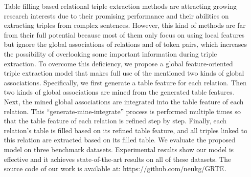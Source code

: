 Table filling based relational triple extraction methods are attracting growing research interests due to their  promising performance and their abilities on extracting triples from complex sentences. However, this kind of methods are far from their full potential because most of them only focus on using local features  but ignore the global associations of relations and of token pairs, which increases the possibility of overlooking  some important information during triple extraction. To overcome this deficiency, we propose a global feature-oriented triple extraction model that makes full use of the mentioned two kinds of global associations. Specifically, we first generate a table feature for each relation. Then  two kinds of global associations are mined from the generated table features. Next, the mined global associations are integrated into the table feature of each relation. This ``generate-mine-integrate'' process is performed multiple times so that the table feature of each relation is refined step by step. Finally, each relation's table is filled based on its refined table feature, and all triples linked to this relation are extracted based on its filled table. We evaluate the proposed model on three benchmark datasets. Experimental results show  our model is effective and it achieves state-of-the-art results on all of these datasets. The source code of our work is available at: https://github.com/neukg/GRTE.
